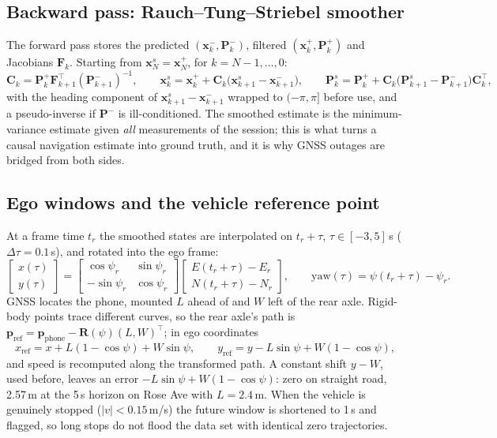 \documentclass[10pt,a4paper]{article}
\newcommand{\x}{\bm{x}}
\newcommand{\Pm}{\mathbf{P}}
\newcommand{\Fm}{\mathbf{F}}
\begin{document}
\subsection{Backward pass: Rauch--Tung--Striebel smoother}
The forward pass stores the predicted $(\x_k^-, \Pm_k^-)$, filtered $(\x_k^+, \Pm_k^+)$ and Jacobians
$\Fm_k$. Starting from $\x_N^s = \x_N^+$, for $k = N-1, \dots, 0$:
\begin{equation}
\mathbf{C}_k = \Pm_k^+ \Fm_{k+1}^\top (\Pm_{k+1}^-)^{-1},\qquad
\x_k^s = \x_k^+ + \mathbf{C}_k\big(\x_{k+1}^s - \x_{k+1}^-\big),\qquad
\Pm_k^s = \Pm_k^+ + \mathbf{C}_k\big(\Pm_{k+1}^s - \Pm_{k+1}^-\big)\mathbf{C}_k^\top,
\end{equation}
with the heading component of $\x^s_{k+1} - \x^-_{k+1}$ wrapped to $(-\pi,\pi]$ before use, and a
pseudo-inverse if $\Pm^-$ is ill-conditioned. The smoothed estimate is the minimum-variance estimate given
\emph{all} measurements of the session; this is what turns a causal navigation estimate into ground truth,
and it is why GNSS outages are bridged from both sides.

\subsection{Ego windows and the vehicle reference point}
At a frame time $t_r$ the smoothed states are interpolated on $t_r + \tau$, $\tau \in [-3, 5]$\,s
($\Delta\tau = 0.1$\,s), and rotated into the ego frame:
\begin{equation}
\begin{bmatrix} x(\tau)\\ y(\tau)\end{bmatrix} =
\begin{bmatrix} \cos\psi_r & \sin\psi_r\\ -\sin\psi_r & \cos\psi_r\end{bmatrix}
\begin{bmatrix} E(t_r{+}\tau) - E_r\\ N(t_r{+}\tau) - N_r\end{bmatrix},\qquad
\text{yaw}(\tau) = \psi(t_r{+}\tau) - \psi_r .
\end{equation}
GNSS locates the phone, mounted $L$ ahead of and $W$ left of the rear axle. Rigid-body points trace different
curves, so the rear axle's path is $\bm p_\text{ref} = \bm p_\text{phone} - \mathbf{R}(\psi)(L, W)^\top$; in
ego coordinates
\begin{equation}
x_\text{ref} = x + L(1-\cos\psi) + W\sin\psi,\qquad y_\text{ref} = y - L\sin\psi + W(1-\cos\psi),
\end{equation}
and speed is recomputed along the transformed path. A constant shift $y - W$, used before, leaves an error
$-L\sin\psi + W(1-\cos\psi)$: zero on straight road, 2.57\,m at the 5\,s horizon on Rose Ave with $L=2.4$\,m.
When the vehicle is genuinely stopped ($|v| < 0.15$\,m/s) the future window is shortened to 1\,s and flagged,
so long stops do not flood the data set with identical zero trajectories.
\end{document}
